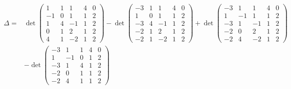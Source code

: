\[
\begin{aligned}
\Delta={}&\det\left(\begin{smallmatrix}1&1&1&4&0\\-1&0&1&1&2\\1&4&-1&1&2\\0&1&2&1&2\\4&1&-2&1&2\end{smallmatrix}\right)
-\det\left(\begin{smallmatrix}-3&1&1&4&0\\1&0&1&1&2\\-3&4&-1&1&2\\-2&1&2&1&2\\-2&1&-2&1&2\end{smallmatrix}\right)
+\det\left(\begin{smallmatrix}-3&1&1&4&0\\1&-1&1&1&2\\-3&1&-1&1&2\\-2&0&2&1&2\\-2&4&-2&1&2\end{smallmatrix}\right)\\
&-\det\left(\begin{smallmatrix}-3&1&1&4&0\\1&-1&0&1&2\\-3&1&4&1&2\\-2&0&1&1&2\\-2&4&1&1&2\end{smallmatrix}\right)
\end{aligned}
\]
